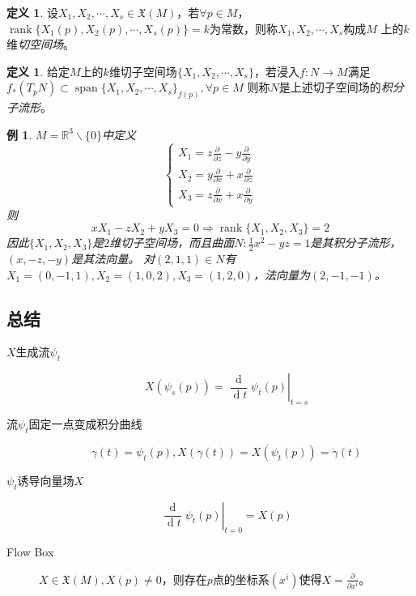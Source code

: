 \documentclass[winfonts,UTF8,c5size,a4paper,fancyhdr,hyperref,titlepage,nocap]{ctexart}
\newtheorem{exa}[thm]{例}
\theoremstyle{definition}
\newtheorem{defn}[thm]{定义}
\theoremstyle{remark}
\numberwithin{equation}{subsection}
\newcommand{\Real}{\mathbb{R}}
\newcommand{\red}{\color{red}}
\newcommand{\dt}{\frac{\operatorname{d}}{\operatorname{d}t}}
\newcommand{\pfrac}[2]{\frac{\partial{#1}}{\partial{#2}}}
\newcommand{\rank}{\operatorname{rank}}
\newcommand{\spa}{\operatorname{span}}
\newcommand{\Xf}[1]{\mathfrak{X}(#1)}
\newcommand{\local}[2]{\left.{#1}\right|_{#2}}%
\newcommand{\localt}[1]{\local{#1}{t=0}}%
\begin{document}
\begin{defn}
  设$X_1,X_2,\cdots,X_s\in\Xf{M}$，若$\forall p\in M$，$\rank\{X_1(p),X_2(p),\cdots,X_s(p)\}=k$为常数，则称$X_1,X_2,\cdots,X_s$构成$M$ 上的$k$维\emph{\red 切空间场}。
\end{defn}
\begin{defn}
给定$M$上的$k$维切子空间场$\{X_1,X_2,\cdots,X_s\}$，若浸入$f\colon N\to M$满足
$f_{\ast}(T_pN)\subset \spa\{X_1,X_2,\cdots,X_s\}_{f(p)},\forall p\in M$
则称$N$是上述切子空间场的\emph{\red 积分子流形}。
\end{defn}
\begin{exa}
  $M=\Real^3\backslash\{0\}$中定义
\begin{equation*}
  \begin{cases}
    X_1=z\pfrac{}{z}-y\pfrac{}{y}\\
    X_2=y\pfrac{}{x}+x\pfrac{}{z}\\
    X_3=z\pfrac{}{x}+x\pfrac{}{y}
  \end{cases}
\end{equation*}
则
\begin{equation*}
xX_1-zX_2+yX_3=0\Rightarrow\rank\{X_1,X_2,X_3\}=2
\end{equation*}
因此$\{X_1,X_2,X_3\}$是$2$维切子空间场，而且曲面$N\colon\frac{1}{2}x^2-yz=1$是其积分子流形，$(x,-z,-y)$是其法向量。
对$(2,1,1)\in N$有$X_1=(0,-1,1),X_2=(1,0,2),X_3=(1,2,0)$，法向量为$(2,-1,-1)$。
\end{exa}
\subsection*{总结}
\begin{description}
  \item[$X$生成流$\psi_t$]
  \begin{equation*}
  X(\psi_s(p))=\local{\dt\psi_t(p)}{t=s}
  \end{equation*}
  \item[流$\psi_t$固定一点变成积分曲线]
  \begin{equation*}
  \gamma(t)=\psi_t(p), X(\gamma(t))=X(\psi_t(p))=\dot{\gamma}(t)
  \end{equation*}
  \item[$\psi_t$诱导向量场$X$]
  \begin{equation*}
  \localt{\dt\psi_t(p)}=X(p)
  \end{equation*}
  \item[Flow Box]  $X\in\Xf{M},X(p)\neq0$，则存在$p$点的坐标系$(x^i)$使得$X=\pfrac{}{x^i}$。
\end{description}
\end{document}
